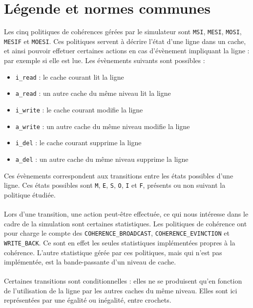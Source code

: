 \section{Légende et normes communes}

Les cinq politiques de cohérences gérées par le simulateur sont \verb!MSI!, \verb!MESI!, \verb!MOSI!, \verb!MESIF! et \verb!MOESI!. Ces politiques servent à décrire l'état d'une ligne dans un cache, et ainsi pouvoir effetuer certaines actions en cas d'évènement impliquant la ligne : par exemple si elle est lue. Les évènements suivants sont possibles :
\begin{itemize}
\item{\verb!i_read! : le cache courant lit la ligne}
\item{\verb!a_read! : un autre cache du même niveau lit la ligne}
\item{\verb!i_write! : le cache courant modifie la ligne}
\item{\verb!a_write! : un autre cache du même niveau modifie la ligne}
\item{\verb!i_del! : le cache courant supprime la ligne}
\item{\verb!a_del! : un autre cache du même niveau supprime la ligne}\\
\end{itemize}
Ces évènements correspondent aux transitions entre les états possibles d'une ligne. Ces états possibles sont \verb!M!, \verb!E!, \verb!S!, \verb!O!, \verb!I! et \verb!F!, présents ou non suivant la politique étudiée.

\paragraph{}
Lors d'une transition, une action peut-être effectuée, ce qui nous intéresse dans le cadre de la simulation sont certaines statistiques. Les politiques de cohérence ont pour charge le compte des \verb!COHERENCE_BROADCAST!, \verb!COHERENCE_EVINCTION! et \verb!WRITE_BACK!. Ce sont en effet les seules statistiques implémentées propres à la cohérence. L'autre statistique gérée par ces politiques, mais qui n'est pas implémentée, est la bande-passante d'un niveau de cache. 

\paragraph{}
Certaines transitions sont conditionnelles : elles ne se produisent qu'en fonction de l'utilisation de la ligne par les autres caches du même niveau. Elles sont ici représentées par une égalité ou inégalité, entre crochets.

